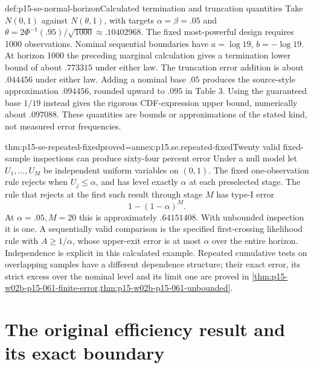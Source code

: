 \begin{hbexample}{def:p15-se-normal-horizon}{Calculated termination and truncation quantities}
Take \(N(0,1)\) against \(N(\theta,1)\), with targets
\(\alpha=\beta=.05\) and
\(\theta=2\Phi^{-1}(.95)/\sqrt{1000}\approx.10402968\).
The fixed most-powerful design requires 1000 observations. Nominal
sequential boundaries have \(a=\log19\), \(b=-\log19\).
At horizon 1000 the preceding marginal calculation gives a termination
lower bound of about \(.773315\) under either law. The truncation
error addition is about \(.044456\) under either law. Adding a nominal
base \(.05\) produces the source-style approximation \(.094456\),
rounded upward to \(.095\) in Table 3. Using the guaranteed base
\(1/19\) instead gives the rigorous CDF-expression upper bound,
numerically about \(.097088\). These quantities are bounds or
approximations of the stated kind, not measured error frequencies.
\end{hbexample}

\begin{hbtheorem}{thm:p15-se-repeated-fixed}{proved=annex:p15.se.repeated-fixed}{Twenty valid fixed-sample inspections can produce sixty-four percent error}
Under a null model let \(U_1,\ldots,U_M\) be independent uniform
variables on \((0,1)\). The fixed one-observation rule rejects when
\(U_j\leq\alpha\), and has level exactly \(\alpha\) at each
preselected stage. The rule that rejects at the first such result through
stage \(M\) has type-I error
\[
                  1-(1-\alpha)^M.
\]
At \(\alpha=.05,M=20\) this is approximately \(.64151408\).
With unbounded inspection it is one. A sequentially valid comparison is
the specified first-crossing likelihood rule with \(A\geq1/\alpha\),
whose upper-exit error is at most \(\alpha\) over the entire horizon.
Independence is explicit in this calculated example. Repeated cumulative
tests on overlapping samples have a different dependence structure; their
exact error, its strict excess over the nominal level and its limit one
are proved in \cref{thm:p15-w02b-p15-061-finite-error,thm:p15-w02b-p15-061-unbounded}.
\end{hbtheorem}

\section{The original efficiency result and its exact boundary}
\label{sec:p15-se-efficiency}

